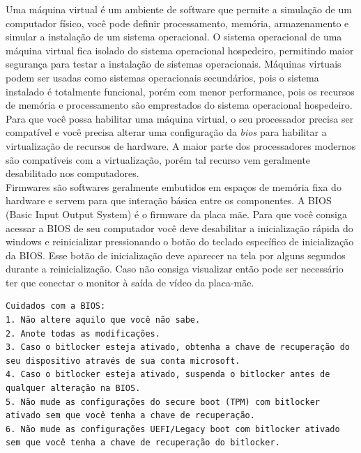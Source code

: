 \documentclass[12pt,a4paper]{article}
\begin{document}
\vspace{\baselineskip}

Uma máquina virtual é um ambiente de software que permite a simulação de um computador físico, você pode definir processamento, memória, armazenamento e simular a instalação de um sistema operacional. O sistema operacional de uma máquina virtual fica isolado do sistema operacional hospedeiro, permitindo maior segurança para testar a instalação de sistemas operacionais. Máquinas virtuais podem ser usadas como sistemas operacionais secundários, pois o sistema instalado é totalmente funcional, porém com menor performance, pois os recursos de memória e processamento são emprestados do sistema operacional hospedeiro. \\

Para que você possa habilitar uma máquina virtual, o seu processador precisa ser compatível e você precisa alterar uma configuração da \textit{bios} para habilitar a virtualização de recursos de hardware. A maior parte dos processadores modernos são compatíveis com a virtualização, porém tal recurso vem geralmente desabilitado nos computadores.\\

Firmwares são softwares geralmente embutidos em espaços de memória fixa do hardware e servem para que interação básica entre os componentes. A BIOS (Basic Input Output System) é o firmware da placa mãe. Para que você consiga acessar a BIOS de seu computador você deve desabilitar a inicialização rápida do windows e reinicializar pressionando o botão do teclado específico de inicialização da BIOS. Esse botão de inicialização deve aparecer na tela por alguns segundos durante a reinicialização. Caso não consiga visualizar então pode ser necessário ter que conectar o monitor à saída de vídeo da placa-mãe.\\

\begin{lstlisting}
Cuidados com a BIOS:
1. Não altere aquilo que você não sabe.
2. Anote todas as modificações.
3. Caso o bitlocker esteja ativado, obtenha a chave de recuperação do seu dispositivo através de sua conta microsoft. 
4. Caso o bitlocker esteja ativado, suspenda o bitlocker antes de qualquer alteração na BIOS.
5. Não mude as configurações do secure boot (TPM) com bitlocker ativado sem que você tenha a chave de recuperação.
6. Não mude as configurações UEFI/Legacy boot com bitlocker ativado sem que você tenha a chave de recuperação do bitlocker.
\end{lstlisting}
\end{document}
